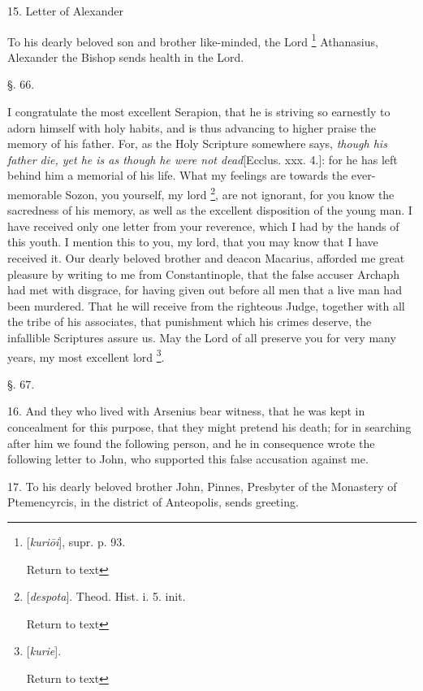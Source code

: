 15. Letter of Alexander

To his dearly beloved son and brother
like-minded, the Lord \footnote{[\emph{kuri\={o}i}], supr. p. 93.

Return to text}
Athanasius, Alexander the Bishop sends health in the Lord.

§. 66.

I congratulate the most excellent Serapion, that
he is striving so earnestly to adorn himself with holy habits, and is
thus advancing to higher praise the memory of his father. For, as the
Holy Scripture somewhere says, \emph{though his father die, yet he is as
though he were not dead}[Ecclus. xxx. 4.]: for he has left behind
him a memorial of his life. What my feelings are towards the
ever-memorable Sozon, you yourself, my lord \footnote{[\emph{despota}]. Theod. Hist. i. 5. init.

Return to text}, are not ignorant, for you know the sacredness of his memory,
as well as the excellent disposition of the young man. I have received
only one letter from your reverence, which I had by the hands of this
youth. I mention this to you, my lord, that you may know that I have
received it. Our dearly beloved brother and deacon Macarius, afforded
me great pleasure by writing to me from Constantinople, that the false
accuser Archaph had met with disgrace, for having given out before all
men that a live man had been murdered. That he will receive from the
righteous Judge, together with all the tribe of his associates, that
punishment which his crimes deserve, the infallible Scriptures assure
us. May the Lord of all preserve you for very many years, my most
excellent lord \footnote{[\emph{kurie}].

Return to text}.

§. 67.

16. And they who lived with Arsenius bear
witness, that he was kept in concealment for this purpose, that they
might pretend his death; for in searching after him we found the
following person, and he in consequence wrote the following letter to John, who supported this false accusation against me.

17. To his dearly beloved brother John, Pinnes,
Presbyter of the Monastery of Ptemencyrcis, in the district of
Anteopolis, sends greeting.

